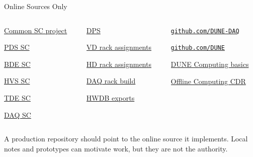 \documentclass[aspectratio=169,10pt]{beamer}
\newcommand{\edmsdoc}[2]{\href{https://edms.cern.ch/document/#1}{#2}}
\newcommand{\edmsproject}[2]{\href{https://edms.cern.ch/project/#1}{#2}}
\newcommand{\ghorg}[1]{\href{https://github.com/#1}{\nolinkurl{github.com/#1}}}
\newcommand{\webref}[2]{\href{#1}{#2}}
\begin{document}
\begin{frame}{Online Sources Only}
\begin{columns}[T,onlytextwidth]
  \begin{column}{0.32\textwidth}
      {\edmsproject{CERN-0000266175}{Common SC project}\par
       \edmsdoc{3309688}{PDS SC}\par
       \edmsdoc{3362709}{BDE SC}\par
       \edmsdoc{3315615}{HVS SC}\par
       \edmsdoc{3297045}{TDE SC}\par
       \edmsdoc{3449868}{DAQ SC}}
      {}
  \end{column}
  \begin{column}{0.32\textwidth}
      {\edmsdoc{2401090}{DPS}\par
       \edmsdoc{2741879/1}{VD rack assignments}\par
       \edmsdoc{2429058/3}{HD rack assignments}\par
       \edmsdoc{2794420/1}{DAQ rack build}\par
       \edmsproject{CERN-0000279681}{HWDB exports}}
      {}
  \end{column}
  \begin{column}{0.32\textwidth}
      {\ghorg{DUNE-DAQ}\par
       \ghorg{DUNE}\par
       \webref{https://dune.github.io/computing-basics/}{DUNE Computing basics}\par
       \webref{https://arxiv.org/abs/2210.15665}{Offline Computing CDR}}
      {}
  \end{column}
\end{columns}
\medskip
{}
  {A production repository should point to the online source it implements. Local notes and prototypes can motivate work, but they are not the authority.}
  {}
\end{frame}
\end{document}
